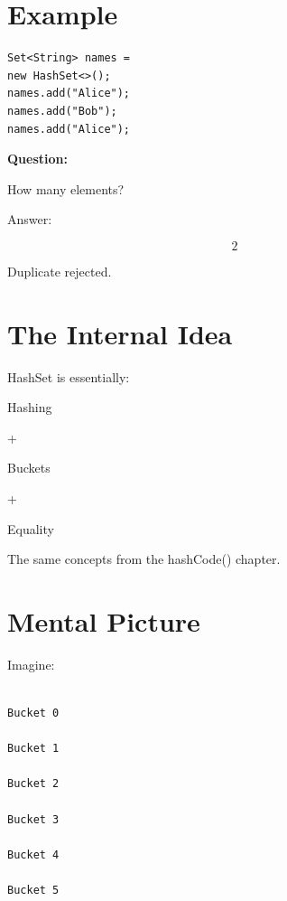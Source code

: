 \documentclass[11pt,a4paper]{book}
\begin{document}

\section{Example}

\begin{verbatim} 
Set<String> names =
new HashSet<>();
names.add("Alice");
names.add("Bob");
names.add("Alice");
\end{verbatim}


\textbf{\textbf{Question:}}

How many elements?


Answer:

\[
2
\]


Duplicate rejected.


\section{The Internal Idea}

HashSet is essentially:


Hashing

+

Buckets

+

Equality


The same concepts from the
hashCode() chapter.


\section{Mental Picture}

Imagine:

\begin{verbatim}

Bucket 0

Bucket 1

Bucket 2

Bucket 3

Bucket 4

Bucket 5

\end{verbatim}
\end{document}
